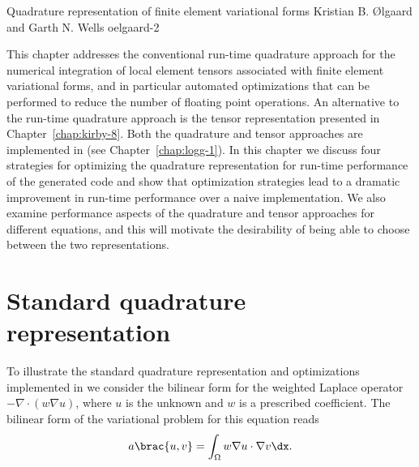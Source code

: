               {Quadrature representation of finite element variational forms}
              {Kristian B. \O{}lgaard and Garth N. Wells}
              {oelgaard-2}

This chapter addresses the conventional run-time quadrature approach
for the numerical integration of local element tensors associated with
finite element variational forms, and in particular automated
optimizations that can be performed to reduce the number of floating
point operations.  An alternative to the run-time quadrature approach
is the tensor representation presented in Chapter~\ref{chap:kirby-8}.
Both the quadrature and tensor approaches are implemented in \ffc{}
(see Chapter~\ref{chap:logg-1}).  In this chapter we discuss four
strategies for optimizing the quadrature representation for run-time
performance of the generated code and show that optimization
strategies lead to a dramatic improvement in run-time performance over
a naive implementation.  We also examine performance aspects of the
quadrature and tensor approaches for different equations, and this
will motivate the desirability of being able to choose between the two
representations.

\section{Standard quadrature representation}
\label{oelgaard-2:sec:standard_quadrature_representation}

To illustrate the standard quadrature representation  and optimizations implemented in \ffc{} we consider
the bilinear form for the weighted Laplace operator $-\nabla \cdot (w
\nabla u)$, where $u$ is the unknown and $w$ is a prescribed
coefficient.  The bilinear form of the variational problem for this
equation reads
%
\begin{equation}
  a\brac{u, v} = \int_{\Omega} w \nabla u \cdot \nabla v \dx.
  \label{oelgaard-2:eq:weightedlaplacian}
\end{equation}

